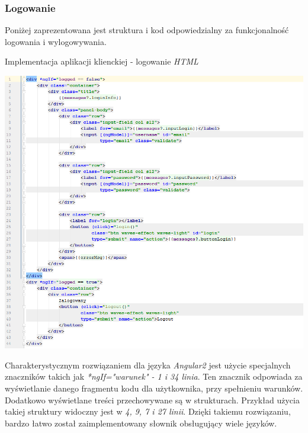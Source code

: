\documentclass[10pt,titlepage]{article} %
\begin{document}
\subsubsection{Logowanie}
Poniżej zaprezentowana jest struktura i kod odpowiedzialny za funkcjonalność logowania i wylogowywania.

\begin{listing}[H]
\caption[Implementacja aplikacji klienckiej - logowanie \textit{HTML}]{Implementacja aplikacji klienckiej - logowanie \textit{HTML}}
\includegraphics[width=1.0\textwidth, height=0.8\textheight]{img/sekcja3/frontend/logowanieHtml}
\end{listing}

Charakterystycznym rozwiązaniem dla języka \textit{Angular2} jest użycie specjalnych znaczników takich jak \textit{*ngIf="warunek" - 1 i 34 linia}. Ten znacznik odpowiada za wyświetlanie danego fragmentu kodu dla użytkownika, przy spełnieniu warunków. Dodatkowo wyświetlane treści przechowywane są w strukturach. Przykład użycia takiej struktury widoczny jest w \textit{ 4, 9, 7 i 27 linii}. Dzięki takiemu rozwiązaniu, bardzo łatwo został zaimplementowany słownik obsługujący wiele języków.
\end{document}
